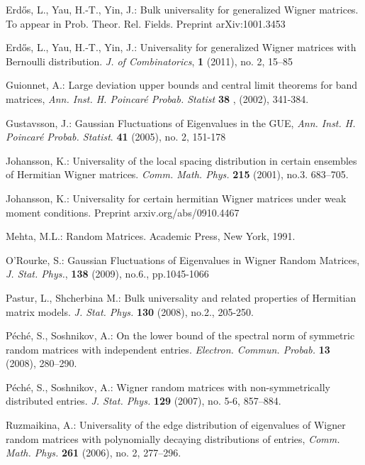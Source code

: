 \documentclass[draft]{article}
\numberwithin{equation}{section}
\numberwithin{theorem}{section}
\numberwithin{definition}{section}
\numberwithin{remark}{section}
\begin{document}
 Erd{\H o}s, L.,  Yau, H.-T., Yin, J.: 
Bulk universality for generalized Wigner matrices. 
To appear in Prob. Theor. Rel. Fields.  Preprint arXiv:1001.3453

  Erd{\H o}s, L.,  Yau, H.-T., Yin, J.: 
Universality for generalized Wigner matrices with Bernoulli
distribution.  {\it J. of Combinatorics}, {\bf 1} (2011), no. 2, 15--85







  Guionnet, A.:
Large deviation upper bounds
and central limit theorems for band matrices,
{\it Ann. Inst. H. Poincar\'e Probab. Statist }
{\bf 38 }, (2002), 341-384.



 Gustavsson, J.: Gaussian Fluctuations of Eigenvalues in the GUE, 
{\it Ann. Inst. H. Poincar\'e Probab. Statist}. {\bf 41} (2005), no. 2, 151-178




 Johansson, K.: Universality of the local spacing
distribution in certain ensembles of Hermitian Wigner matrices.
{\it Comm. Math. Phys.} {\bf 215} (2001), no.3. 683--705.

 Johansson, K.: Universality for certain hermitian Wigner
matrices under weak moment conditions. Preprint 
{arxiv.org/abs/0910.4467}


 Mehta, M.L.: Random Matrices. Academic Press, New York, 1991.


  O'Rourke, S.: Gaussian Fluctuations of Eigenvalues in Wigner Random Matrices, 
{\it J. Stat. Phys.}, {\bf 138} (2009), no.6., pp.1045-1066


 Pastur, L., Shcherbina M.:
Bulk universality and related properties of Hermitian matrix models.
{\it J. Stat. Phys.} {\bf 130} (2008), no.2., 205-250.


P\'ech\'e, S., Soshnikov, A.: On the lower bound of the spectral norm 
of symmetric random matrices with independent entries. 
 {\it Electron. Commun. Probab.}  \textbf{13}  (2008), 280--290.

P\'ech\'e, S., Soshnikov, A.: Wigner random matrices with non-symmetrically
 distributed entries.  {\it J. Stat. Phys.}  \textbf{129}  (2007),  no. 5-6, 857--884.


Ruzmaikina, A.: Universality of the edge distribution of eigenvalues of Wigner random 
matrices with polynomially decaying distributions of entries,
 {\it Comm. Math. Phys.} {\bf 261} (2006), no. 2, 277--296. 
\end{document}

